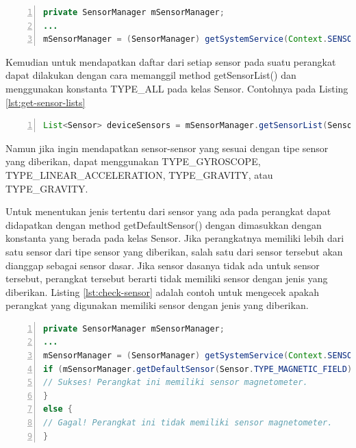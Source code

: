 \documentclass[a4paper,twoside]{article}
\begin{document}
\begin{enumerate}
\begin{lstlisting}[language=java,numbers=left,breaklines=true,caption={Contoh inisialisasi kelas SensorManager},label={lst:init-sensor-manager},language=java]
private SensorManager mSensorManager;
...
mSensorManager = (SensorManager) getSystemService(Context.SENSOR_SERVICE);
\end{lstlisting}

Kemudian untuk mendapatkan daftar dari setiap sensor pada suatu perangkat dapat dilakukan dengan cara memanggil method getSensorList() dan menggunakan konstanta TYPE\_ALL pada kelas Sensor. Contohnya pada Listing \ref{lst:get-sensor-lists}

\begin{lstlisting}[language=java,numbers=left,breaklines=true,caption={Contoh untuk mendapatkan daftar dari setiap sensor yang ada},label={lst:get-sensor-lists},language=java]
List<Sensor> deviceSensors = mSensorManager.getSensorList(Sensor.TYPE_ALL);
\end{lstlisting}

Namun jika ingin mendapatkan sensor-sensor yang sesuai dengan tipe sensor yang diberikan, dapat menggunakan TYPE\_GYROSCOPE, TYPE\_LINEAR\_ACCELERATION, TYPE\_GRAVITY, atau TYPE\_GRAVITY.

Untuk menentukan jenis tertentu dari sensor yang ada pada perangkat dapat didapatkan dengan method getDefaultSensor() dengan dimasukkan dengan konstanta yang berada pada kelas Sensor. Jika perangkatnya memiliki lebih dari satu sensor dari tipe sensor yang diberikan, salah satu dari sensor tersebut akan dianggap sebagai sensor dasar. Jika sensor dasanya tidak ada untuk sensor tersebut, perangkat tersebut berarti tidak memiliki sensor dengan jenis yang diberikan. Listing \ref{lst:check-sensor} adalah contoh untuk mengecek apakah perangkat yang digunakan memiliki sensor dengan jenis yang diberikan.

\begin{lstlisting}[language=java,numbers=left,breaklines=true,caption={Contoh untuk mengecek apakah perangkat yang digunakan memiliki sensor dengan jenis yang diberikan},label={lst:check-sensor},language=java]
private SensorManager mSensorManager;
...
mSensorManager = (SensorManager) getSystemService(Context.SENSOR_SERVICE);
if (mSensorManager.getDefaultSensor(Sensor.TYPE_MAGNETIC_FIELD) != null){
// Sukses! Perangkat ini memiliki sensor magnetometer.
}
else {
// Gagal! Perangkat ini tidak memiliki sensor magnetometer.
}
\end{lstlisting}


\end{enumerate}
\end{document}
